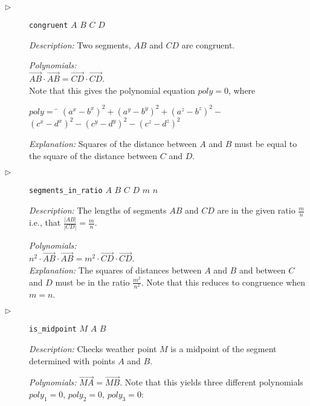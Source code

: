 \documentclass{aicom2e}
\begin{document}
\begin{description}
\item[$\triangleright$] {\tt congruent} $A$ $B$ $C$ $D$

  {\em Description:} Two segments, $AB$ and $CD$ are
  congruent.


{\em Polynomials:} \\
$\overrightarrow{AB} \cdot \overrightarrow{AB} = \overrightarrow{CD} \cdot \overrightarrow{CD}$. \\
Note that this gives the polynomial equation $poly = 0$, where

\begin{tabbing}
$poly = $ \= $({a^x} - {b^x})^2 + ({a^y} - {b^y})^2 + ({a^z} - {b^z})^2 -$ \\ 
          \> $({c^x} - {d^x})^2 - ({c^y} - {d^y})^2 - ({c^z} - {d^z})^2$
\end{tabbing}

{\em Explanation:} Squares of the distance between $A$ and $B$ must be
equal to the square of the distance between $C$ and $D$.

\item[$\triangleright$] {\tt segments\_in\_ratio} $A$ $B$ $C$ $D$
  $m$ $n$ 

  {\em Description:} The lengths of segments $AB$ and
  $CD$ are in the given ratio $\frac{m}{n}$ i.e., that
  $\frac{|AB|}{|CD|} = \frac{m}{n}$.

{\em Polynomials:} \\
$n^2 \cdot \overrightarrow{AB} \cdot \overrightarrow{AB} = m^2 \cdot \overrightarrow{CD} \cdot \overrightarrow{CD}$. \\


{\em Explanation:} The squares of distances between $A$ and $B$ and
between $C$ and $D$ must be in the ratio $\frac{m^2}{n^2}$. Note that
this reduces to congruence when $m = n$.

\item[$\triangleright$] {\tt is\_midpoint} $M$ $A$ $B$

{\em Description:} Checks weather point $M$ is a midpoint of the
segment determined with points $A$ and $B$.

{\em Polynomials:} $\overrightarrow{MA} = \overrightarrow{MB}$.  Note
that this yields three different polynomials $poly_1 = 0$,
$poly_2 = 0$, $poly_3 = 0$:


\end{description}
\end{document}
